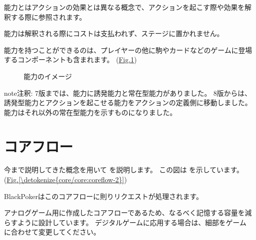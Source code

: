 \documentclass[letterpaper,10pt,dvipdfmx]{sphinxmanual}
\begin{document}
\sphinxAtStartPar
能力とはアクションの効果とは異なる概念で、アクションを起こす際や効果を解釈する際に参照されます。

\sphinxAtStartPar
能力は解釈される際にコストは支払われず、ステージに置かれません。

\sphinxAtStartPar
能力を持つことができるのは、プレイヤーの他に駒やカードなどのゲームに登場するコンポーネントも含まれます。
(\hyperref[\detokenize{core/core:ability-image}]{Fig.\@ \ref{\detokenize{core/core:ability-image}}})

\begin{figure}[htbp]
\centering
\capstart

\noindent{}
\caption{能力のイメージ}\label{\detokenize{core/core:id37}}\label{\detokenize{core/core:ability-image}}\end{figure}

\begin{sphinxadmonition}{note}{注釈:}
\sphinxAtStartPar
7版までは、能力に誘発能力と常在型能力がありました。
8版からは、誘発型能力とアクションを起こせる能力をアクションの定義側に移動しました。
能力はそれ以外の常在型能力を示すものになりました。
\end{sphinxadmonition}

\ignorespaces 

\section{コアフロー}
\label{\detokenize{core/core:coreflowsec}}\label{\detokenize{core/core:index-19}}\label{\detokenize{core/core:id24}}
\sphinxAtStartPar
今まで説明してきた概念を用いて  を説明します。
この図は  を示しています。(\hyperref[\detokenize{core/core:coreflow-2}]{Fig.\@ \ref{\detokenize{core/core:coreflow-2}}})

\sphinxAtStartPar
BlackPokerはこのコアフローに則りリクエストが処理されます。

\sphinxAtStartPar
アナログゲーム用に作成したコアフローであるため、なるべく記憶する容量を減らすように設計しています。
デジタルゲームに応用する場合は、細部をゲームに合わせて変更してください。
\end{document}
